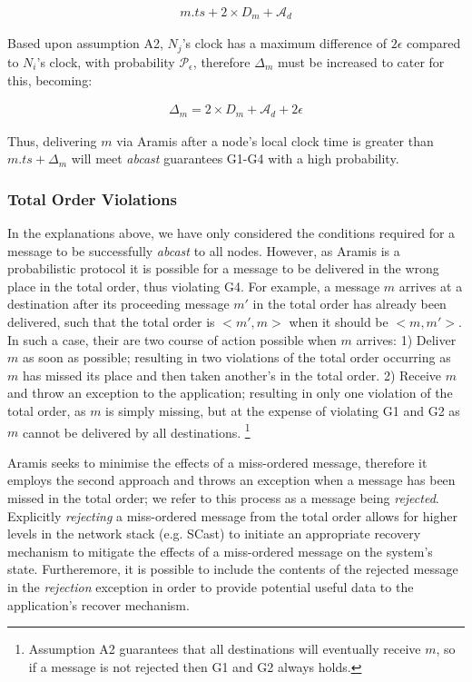 		\begin{equation*}
		    \begin{aligned}
		        m.ts + 2\times{D_m} + \mathcal{A}_d
		    \end{aligned}
		\end{equation*}
		 
		 Based upon assumption A2, $N_j$'s clock has a maximum difference of $2\epsilon$ compared to $N_i$'s clock, with  probability $\mathcal{P}_\epsilon$, therefore $\Delta_m$ must be increased to cater for this, becoming:
		
        \begin{equation*}
		    \begin{aligned}
		        \Delta_m = 2 \times D_m + \mathcal{A}_d + 2\epsilon
		    \end{aligned}
		\end{equation*}		
		
		Thus, delivering $m$ via \textsf{Aramis} after a node's local clock time is greater than $m.ts + \Delta_m$ will meet \emph{abcast} guarantees G1-G4 with a high probability.
			    
		\subsubsection*{Total Order Violations}\label{ssec:abcast_rejection}
		In the explanations above, we have only considered the conditions required for a message to be successfully \emph{abcast} to all nodes.  However, as \textsf{Aramis} is a probabilistic protocol it is possible for a message to be delivered in the wrong place in the total order, thus violating G4.  For example, a message $m$ arrives at a destination after its proceeding message $m'$ in the total order has already been delivered, such that the total order is $<m', m>$ when it should be $<m, m'>$.  In such a case, their are two course of action possible when $m$ arrives: 1) Deliver $m$ as soon as possible; resulting in two violations of the total order occurring as $m$ has missed its place and then taken another's in the total order.  2) Receive $m$ and throw an exception to the application; resulting in only one violation of the total order, as $m$ is simply missing, but at the expense of violating G1 and G2 as $m$ cannot be delivered by all destinations.  \footnote{Assumption A2 guarantees that all destinations will eventually receive $m$, so if a message is not rejected then G1 and G2 always holds.}
		
		\textsf{Aramis} seeks to minimise the effects of a miss-ordered message, therefore it employs the second approach and throws an exception when a message has been missed in the total order; we refer to this process as a message being \emph{rejected}.  Explicitly \emph{rejecting} a miss-ordered message from the total order allows for higher levels in the network stack (e.g. \textsf{SCast}) to initiate an appropriate recovery mechanism to mitigate the effects of a miss-ordered message on the system's state.  Furtheremore, it is possible to include the contents of the rejected message in the \emph{rejection} exception in order to provide potential useful data to the application's recover mechanism.  
		
